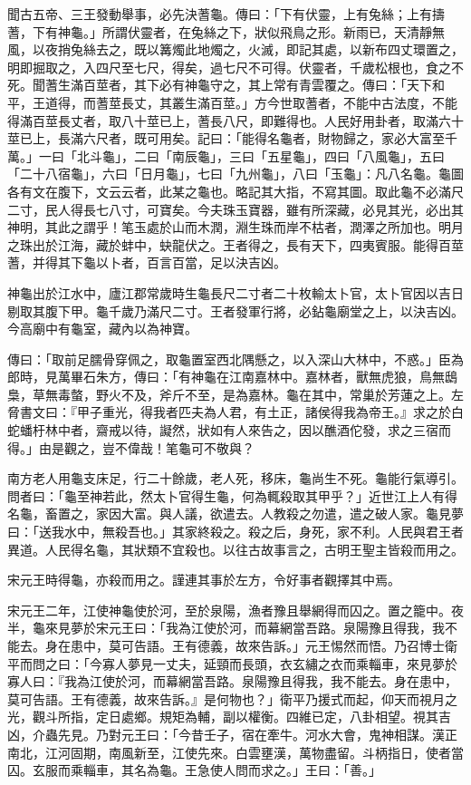 \begin{pinyinscope}
聞古五帝、三王發動舉事，必先決蓍龜。傳曰：「下有伏靈，上有兔絲；上有擣蓍，下有神龜。」所謂伏靈者，在兔絲之下，狀似飛鳥之形。新雨已，天清靜無風，以夜捎兔絲去之，既以篝燭此地燭之，火滅，即記其處，以新布四丈環置之，明即掘取之，入四尺至七尺，得矣，過七尺不可得。伏靈者，千歲松根也，食之不死。聞蓍生滿百莖者，其下必有神龜守之，其上常有青雲覆之。傳曰：「天下和平，王道得，而蓍莖長丈，其叢生滿百莖。」方今世取蓍者，不能中古法度，不能得滿百莖長丈者，取八十莖已上，蓍長八尺，即難得也。人民好用卦者，取滿六十莖已上，長滿六尺者，既可用矣。記曰：「能得名龜者，財物歸之，家必大富至千萬。」一曰「北斗龜」，二曰「南辰龜」，三曰「五星龜」，四曰「八風龜」，五曰「二十八宿龜」，六曰「日月龜」，七曰「九州龜」，八曰「玉龜」：凡八名龜。龜圖各有文在腹下，文云云者，此某之龜也。略記其大指，不寫其圖。取此龜不必滿尺二寸，民人得長七八寸，可寶矣。今夫珠玉寶器，雖有所深藏，必見其光，必出其神明，其此之謂乎！笔玉處於山而木潤，淵生珠而岸不枯者，潤澤之所加也。明月之珠出於江海，藏於蚌中，蚗龍伏之。王者得之，長有天下，四夷賓服。能得百莖蓍，并得其下龜以卜者，百言百當，足以決吉凶。

神龜出於江水中，廬江郡常歲時生龜長尺二寸者二十枚輸太卜官，太卜官因以吉日剔取其腹下甲。龜千歲乃滿尺二寸。王者發軍行將，必鉆龜廟堂之上，以決吉凶。今高廟中有龜室，藏內以為神寶。

傳曰：「取前足臑骨穿佩之，取龜置室西北隅懸之，以入深山大林中，不惑。」臣為郎時，見萬畢石朱方，傳曰：「有神龜在江南嘉林中。嘉林者，獸無虎狼，鳥無鴟梟，草無毒螫，野火不及，斧斤不至，是為嘉林。龜在其中，常巢於芳蓮之上。左脅書文曰：『甲子重光，得我者匹夫為人君，有土正，諸侯得我為帝王。』求之於白蛇蟠杅林中者，齋戒以待，譺然，狀如有人來告之，因以醮酒佗發，求之三宿而得。」由是觀之，豈不偉哉！笔龜可不敬與？

南方老人用龜支床足，行二十餘歲，老人死，移床，龜尚生不死。龜能行氣導引。問者曰：「龜至神若此，然太卜官得生龜，何為輒殺取其甲乎？」近世江上人有得名龜，畜置之，家因大富。與人議，欲遣去。人教殺之勿遣，遣之破人家。龜見夢曰：「送我水中，無殺吾也。」其家終殺之。殺之后，身死，家不利。人民與君王者異道。人民得名龜，其狀類不宜殺也。以往古故事言之，古明王聖主皆殺而用之。

宋元王時得龜，亦殺而用之。謹連其事於左方，令好事者觀擇其中焉。

宋元王二年，江使神龜使於河，至於泉陽，漁者豫且舉網得而囚之。置之籠中。夜半，龜來見夢於宋元王曰：「我為江使於河，而幕網當吾路。泉陽豫且得我，我不能去。身在患中，莫可告語。王有德義，故來告訴。」元王惕然而悟。乃召博士衛平而問之曰：「今寡人夢見一丈夫，延頸而長頭，衣玄繡之衣而乘輜車，來見夢於寡人曰：『我為江使於河，而幕網當吾路。泉陽豫且得我，我不能去。身在患中，莫可告語。王有德義，故來告訴。』是何物也？」衛平乃援式而起，仰天而視月之光，觀斗所指，定日處鄉。規矩為輔，副以權衡。四維已定，八卦相望。視其吉凶，介蟲先見。乃對元王曰：「今昔壬子，宿在牽牛。河水大會，鬼神相謀。漢正南北，江河固期，南風新至，江使先來。白雲壅漢，萬物盡留。斗柄指日，使者當囚。玄服而乘輜車，其名為龜。王急使人問而求之。」王曰：「善。」


\end{pinyinscope}
